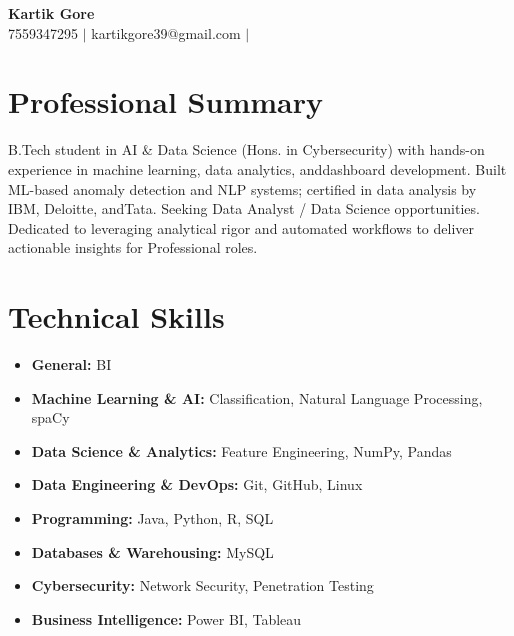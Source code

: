 \documentclass[10pt,letterpaper]{article}
\begin{document}
\begin{center}
    {\LARGE \textbf{Kartik Gore}} \\ \vspace{2pt}
    \small 7559347295 $|$ kartikgore39@gmail.com $|$  
    
    
    
\end{center}

\vspace{-4pt}


\section{Professional Summary}
B.Tech student in AI \& Data Science (Hons. in Cybersecurity) with hands-on experience in machine learning, data analytics, anddashboard development. Built ML-based anomaly detection and NLP systems; certified in data analysis by IBM, Deloitte, andTata. Seeking Data Analyst / Data Science opportunities. Dedicated to leveraging analytical rigor and automated workflows to deliver actionable insights for Professional roles.



\section{Technical Skills}
\begin{itemize}[leftmargin=0em,label={}]
    
    \item \textbf{General:} BI
    
    \item \textbf{Machine Learning & AI:} Classification, Natural Language Processing, spaCy
    
    \item \textbf{Data Science & Analytics:} Feature Engineering, NumPy, Pandas
    
    \item \textbf{Data Engineering & DevOps:} Git, GitHub, Linux
    
    \item \textbf{Programming:} Java, Python, R, SQL
    
    \item \textbf{Databases & Warehousing:} MySQL
    
    \item \textbf{Cybersecurity:} Network Security, Penetration Testing
    
    \item \textbf{Business Intelligence:} Power BI, Tableau
    
\end{itemize}
\end{document}
